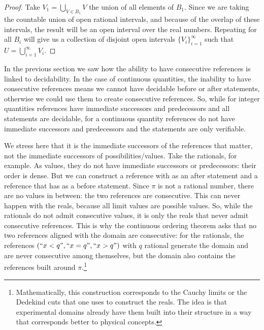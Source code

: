 \begin{mathSection}
\begin{proof}
		Take $V_1 = \bigcup\limits_{V \in B_1} V$ the union of all elements of $B_1$. Since we are taking the countable union of open rational intervals, and because of the overlap of these intervals, the result will be an open interval over the real numbers. Repeating for all $B_i$ will give us a collection of disjoint open intervals $\{ V_i \}_{i=1}^{\infty}$ such that $U = \bigcup\limits_{i=1}^{\infty} V_i$.
	\end{proof}
\end{mathSection}

In the previous section we saw how the ability to have consecutive references is linked to decidability. In the case of continuous quantities, the inability to have consecutive references means we cannot have decidable before or after statements, otherwise we could use them to create consecutive references. So, while for integer quantities references have immediate successors and predecessors and all statements are decidable, for a continuous quantity references do not have immediate successors and predecessors and the statements are only verifiable.

We stress here that it is the immediate successors of the references that matter, not the immediate successors of possibilities/values. Take the rationals, for example. As values, they do not have immediate successors or predecessors: their order is dense. But we can construct a reference with  as an after statement and a reference that has  as a before statement. Since $\pi$ is not a rational number, there are no values in between: the two references are consecutive. This can never happen with the reals, because all limit values are possible values. So, while the rationals do not admit consecutive values, it is only the reals that never admit consecutive references. This is why the continuous ordering theorem asks that no two references aligned with the domain are consecutive: for the rationals, the references $(``x < q", ``x = q", ``x > q")$ with $q$ rational generate the domain and are never consecutive among themselves, but the domain also contains the references built around $\pi$.\footnote{Mathematically, this construction corresponds to the Cauchy limits or the Dedekind cuts that one uses to construct the reals. The idea is that experimental domains already have them built into their structure in a way that corresponds better to physical concepts.}

